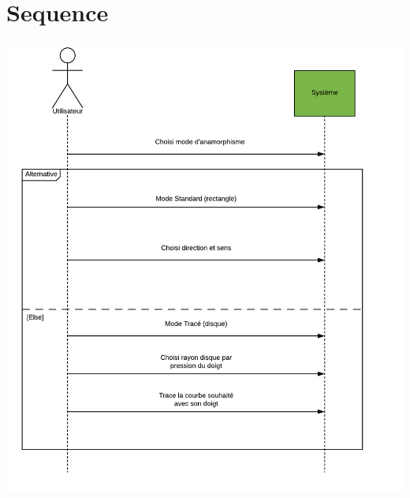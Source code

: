 \documentclass[a4paper,12pt]{report}
\begin{document}
\section{Sequence}
\begin{center}
 \includegraphics[scale=0.7]{./Sequence.png}
\end{center}
\end{document}
